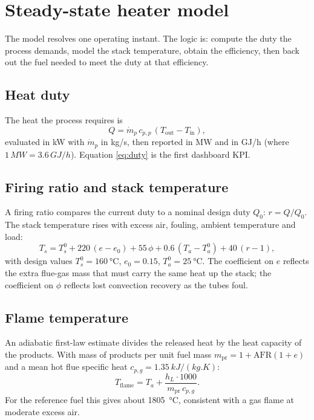 \documentclass[11pt,a4paper]{article}
\begin{document}
\section{Steady-state heater model}\label{sec:heater}

The model resolves one operating instant. The logic is: compute the duty the
process demands, model the stack temperature, obtain the efficiency, then back out
the fuel needed to meet the duty at that efficiency.

\subsection{Heat duty}
The heat the process requires is
\begin{equation}
Q = \dot m_p\, c_{p,p}\,(T_\mathrm{out}-T_\mathrm{in}),
\label{eq:duty}
\end{equation}
evaluated in \si{kW} with $\dot m_p$ in \si{kg/s}, then reported in \si{MW} and in
\si{GJ/h} (where $1\,\si{MW}=3.6\,\si{GJ/h}$). Equation \eqref{eq:duty} is the
first dashboard KPI.

\subsection{Firing ratio and stack temperature}
A firing ratio compares the current duty to a nominal design duty $Q_0$:
$r=Q/Q_0$. The stack temperature rises with excess air, fouling, ambient
temperature and load:
\begin{equation}
T_s = T_s^0 + 220\,(e-e_0) + 55\,\phi + 0.6\,(T_a-T_a^0) + 40\,(r-1),
\label{eq:stack}
\end{equation}
with design values $T_s^0=\SI{160}{\celsius}$, $e_0=0.15$,
$T_a^0=\SI{25}{\celsius}$. The coefficient on $e$ reflects the extra flue-gas mass
that must carry the same heat up the stack; the coefficient on $\phi$ reflects
lost convection recovery as the tubes foul.

\subsection{Flame temperature}
An adiabatic first-law estimate divides the released heat by the heat capacity of
the products. With mass of products per unit fuel mass
$m_\mathrm{pr}=1+\mathrm{AFR}(1+e)$ and a mean hot flue specific heat
$c_{p,g}=\SI{1.35}{kJ/(kg.K)}$:
\begin{equation}
T_\mathrm{flame} = T_a + \frac{h_L\cdot 1000}{m_\mathrm{pr}\, c_{p,g}} .
\end{equation}
For the reference fuel this gives about \SI{1805}{\celsius}, consistent with a
gas flame at moderate excess air.
\end{document}
